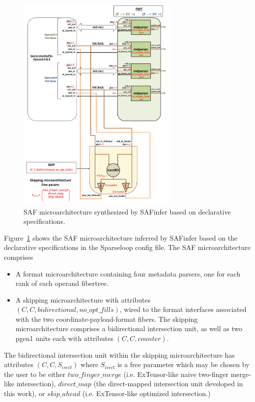 \begin{figure}[ht]
\centering
\includegraphics[width=0.7\textwidth]{figures/case_study_inferred_uarch.pdf}
\caption{SAF microarchitecture synthesized by SAFinfer based on declarative specifications.}
\label{fig:case_study_inferred_uarch}
\end{figure}

\clearpage

Figure~\ref{fig:case_study_inferred_uarch} shows the SAF microarchitecture inferred by SAFinfer based on the declarative specifications in the Sparseloop config file. The SAF microarchitecture comprises

\begin{itemize}
    \item A format microarchitecture containing four metadata parsers, one for each rank of each operand fibertree.
    \item A skipping microarchitecture with attributes $(C,C,bidirectional,no\_opt\_fills)$, wired to the format interfaces associated with the two coordinate-payload-format fibers. The skipping microarchitecture comprises a bidirectional intersection unit, as well as two pgen1 units each with attributes $(C,C,counter)$.
\end{itemize}

The bidirectional intersection unit within the skipping microarchitecture has attributes $(C,C,S_{isect})$ where $S_{isect}$ is a free parameter which may be chosen by the user to be either $two\_finger\_merge$ (i.e. ExTensor-like\cite{extensor} naive two-finger merge-like intersection), $direct\_map$ (the direct-mapped intersection unit developed in this work), or $skip\_ahead$ (i.e. ExTensor-like optimized intersection.)

